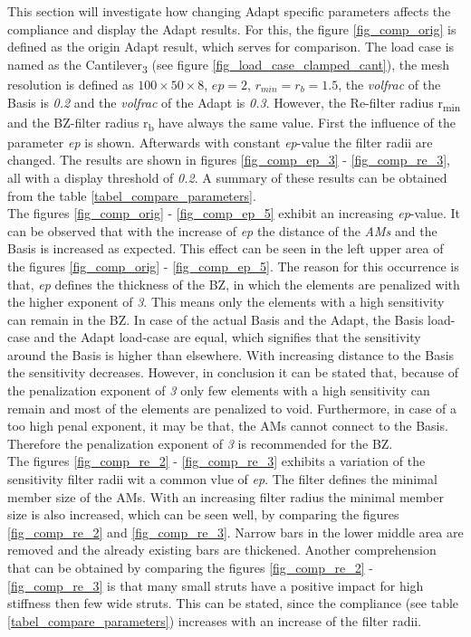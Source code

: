 This section will investigate how changing Adapt specific parameters
 affects the compliance and display the Adapt results.
  For this,
the figure \ref{fig_comp_orig} is defined as the
origin Adapt result, which serves for comparison.
The load case is named as the Cantilever\textsubscript{3} (see figure
\ref{fig_load_case_clamped_cant}), the mesh resolution is 
defined as $100 \times 50 \times 8$, $ep = 2$, $r_{min} = r_b = 1.5$, the \textit{volfrac}
 of the Basis is \emph{0.2} and the \textit{volfrac} of the Adapt is
 \emph{0.3}. 
 However, the
 Re-filter radius r\textsubscript{min} and the BZ-filter 
 radius r\textsubscript{b} have always the same value. First 
 the influence of the parameter \emph{ep} is shown. Afterwards with
  constant \emph{ep}-value the filter radii are changed. The results
  are shown in figures \ref{fig_comp_ep_3} - \ref{fig_comp_re_3},
  all with a display threshold of \emph{0.2}.
  A summary of these results can be obtained from the
  table \ref{tabel_compare_parameters}. \\
  
  The figures \ref{fig_comp_orig} - \ref{fig_comp_ep_5} exhibit an increasing \emph{ep}-value.
  It can be observed that with the 
  increase of \emph{ep} the distance of the \emph{AMs}
  and the Basis is increased as expected. This effect can be seen in
  the left upper area of the figures 
  \ref{fig_comp_orig} - \ref{fig_comp_ep_5}.
  The reason for this occurrence is that, \emph{ep}
  defines the thickness of the BZ, in which the elements
  are penalized with the higher exponent of \emph{3}. This
  means only the elements with a high sensitivity can remain in the
  BZ. In case of the actual Basis and the Adapt, the Basis load-case
  and the Adapt load-case are equal, which
  signifies that the sensitivity around the Basis is 
  higher than elsewhere. With increasing distance to the
  Basis the sensitivity decreases. However, in conclusion it
  can be stated that, because
  of the penalization exponent of 
  \emph{3} only few elements with a high
  sensitivity can remain and 
most of the elements are penalized to void. Furthermore, in case of 
  a too high 
 penal exponent, it may be that, the AMs cannot
  connect to the Basis. Therefore the penalization exponent
  of \emph{3} is recommended for the BZ.\\
  
   The figures
  \ref{fig_comp_re_2} - \ref{fig_comp_re_3} exhibits
  a variation of the sensitivity filter radii wit a common vlue of
  \emph{ep}. The filter defines the
  minimal member size of the AMs. With an increasing 
  filter radius the minimal member size is also increased, which can
  be seen well, by comparing the figures \ref{fig_comp_re_2} and
  \ref{fig_comp_re_3}. Narrow bars in the lower middle area
  are removed and the already existing bars are thickened.
  Another comprehension that can be obtained by
comparing the figures \ref{fig_comp_re_2} - \ref{fig_comp_re_3}
  is that many small struts have a positive impact 
  for high stiffness then few wide struts. This can be stated, since
  the compliance (see table \ref{tabel_compare_parameters}) 
  increases with an increase of the filter radii.\\
 
